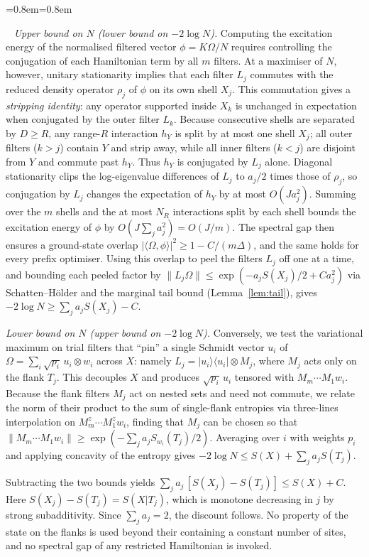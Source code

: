 \documentclass[aps,prx,reprint,superscriptaddress,floatfix,nofootinbib,longbibliography,amsmath,amssymb]{revtex4-2}
\newcommand{\norm}[1]{\lVert #1\rVert}
\newcommand{\abs}[1]{\lvert #1\rvert}
\providecommand{\ket}[1]{|#1\rangle}\renewcommand{\ket}[1]{|#1\rangle}
\providecommand{\bra}[1]{\langle #1|}\renewcommand{\bra}[1]{\langle #1|}
\newcommand{\Om}{\Omega}
\theoremstyle{plain}
\theoremstyle{definition}
\newenvironment{inwords}{%
  \par\medskip\noindent
  \begin{list}{}{\leftmargin=0.8em\rightmargin=0.8em}
  \item\relax
  \noindent{\sffamily\bfseries\color{blue!40!black}In words.}\ \sffamily\small}{%
  \end{list}\par\medskip}
\begin{document}
\begin{inwords}
\emph{Upper bound on $N$ (lower bound on $-2\log N$).} Computing the
excitation energy of the normalised filtered vector $\phi=K\Om/N$ requires
controlling the conjugation of each Hamiltonian term by all $m$ filters.
At a maximiser of $N$, however, unitary stationarity implies that each
filter $L_j$ commutes with the reduced density operator $\rho_j$ of $\phi$
on its own shell $X_j$. This commutation gives a \emph{stripping
identity}: any operator supported inside $X_k$ is unchanged in expectation
when conjugated by the outer filter $L_k$. Because consecutive shells are
separated by $D\ge R$, any range-$R$ interaction $h_Y$ is split by at most
one shell $X_j$; all outer filters ($k>j$) contain $Y$ and strip away,
while all inner filters ($k<j$) are disjoint from $Y$ and commute past
$h_Y$. Thus $h_Y$ is conjugated by $L_j$ alone. Diagonal stationarity clips
the log-eigenvalue differences of $L_j$ to $a_j/2$ times those of $\rho_j$,
so conjugation by $L_j$ changes the expectation of $h_Y$ by at most
$O(Ja_j^2)$. Summing over the $m$ shells and the at most $N_R$ interactions
split by each shell bounds the excitation energy of $\phi$ by
$O(J\sum_j a_j^2)=O(J/m)$. The spectral gap then ensures a ground-state
overlap $\abs{\langle\Om,\phi\rangle}^2\ge 1-C/(m\Delta)$, and the same
holds for every prefix optimiser. Using this overlap to peel the filters
$L_j$ off one at a time, and bounding each peeled factor by
$\norm{L_j\Om}\le\exp(-a_jS(X_j)/2+Ca_j^2)$ via Schatten--Hölder and the
marginal tail bound (Lemma~\ref{lem:tail}), gives
$-2\log N\ge\sum_ja_jS(X_j)-C$.

\emph{Lower bound on $N$ (upper bound on $-2\log N$).} Conversely, we test
the variational maximum on trial filters that ``pin'' a single Schmidt
vector $u_i$ of $\Om=\sum_i\sqrt{p_i}\,u_i\otimes w_i$ across $X$: namely
$L_j=\ket{u_i}\bra{u_i}\otimes M_j$, where $M_j$ acts only on the flank
$T_j$. This decouples $X$ and produces $\sqrt{p_i}\,u_i$ tensored with
$M_m\cdots M_1w_i$. Because the flank filters $M_j$ act on nested sets and
need not commute, we relate the norm of their product to the sum of single-flank
entropies via three-lines interpolation on $M_m^z\cdots M_1^zw_i$, finding
that $M_j$ can be chosen so that
$\norm{M_m\cdots M_1w_i}\ge\exp(-\sum_ja_jS_{w_i}(T_j)/2)$. Averaging over
$i$ with weights $p_i$ and applying concavity of the entropy gives
$-2\log N\le S(X)+\sum_ja_jS(T_j)$.

Subtracting the two bounds yields $\sum_ja_j\,[S(X_j)-S(T_j)]\le S(X)+C$.
Here $S(X_j)-S(T_j)=S(X|T_j)$, which is monotone decreasing in $j$ by
strong subadditivity. Since $\sum_ja_j=2$, the discount follows. No
property of the state on the flanks is used beyond their containing a
constant number of sites, and no spectral gap of any restricted
Hamiltonian is invoked.
\end{inwords}
\end{document}
